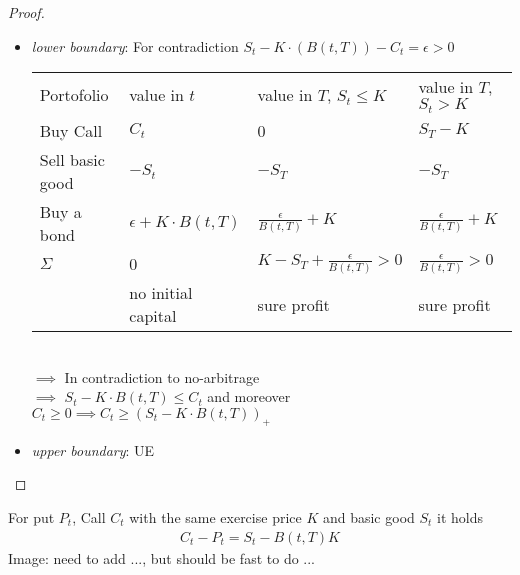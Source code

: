 \begin{proof}
	\begin{itemize}
		\item \emph{lower boundary}: For contradiction $S_t - K\cdot(B(t,T))-C_t = \epsilon > 0$\\
		\begin{tabular}{l|l|l|l} %
			Portofolio & value in $t$ & value in $T$, $S_t \le K$ & value in $T$, $S_t > K$\\
			Buy Call & $C_t$ & 0 & $S_T - K$\\
			Sell basic good & $-S_t$ & $-S_T$ & $-S_T$\\
			Buy a bond & $\epsilon + K\cdot B(t,T)$ & $\frac{\epsilon}{B(t,T)}+K$ & $\frac{\epsilon}{B(t,T)} + K$\\
			$\Sigma$ & 0 & $K - S_T + \frac{\epsilon}{B(t,T)} > 0$ & $\frac{\epsilon}{B(t,T)} > 0$\\
			& no initial capital & sure profit & sure profit\\
		\end{tabular}\\
		$\implies$ In contradiction to no-arbitrage\\
		$\implies$ $S_t - K\cdot B(t,T) \le C_t$ and moreover $C_t \ge 0 \implies C_t \ge (S_t - K\cdot B(t,T))_+$
		\item \emph{upper boundary}: UE
	\end{itemize}
\end{proof}
\begin{lemma} 
	For put $P_t$, Call $C_t$ with the same exercise price $K$ and basic good $S_t$ it holds
	\begin{align*}
	C_t - P_t = S_t - B(t,T)K
	\end{align*}
	Image: need to add ..., but should be fast to do ...
\end{lemma}
